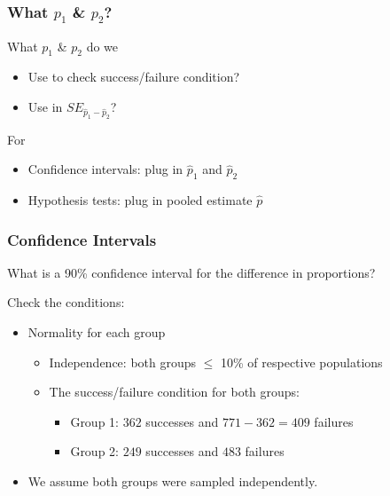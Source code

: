 \documentclass[handout]{beamer}
\newcommand{\blue}[1]{\textcolor{blue2}{#1}}
\newcommand{\phat}{\widehat{p}}
\begin{document}
\begin{frame}[fragile]
\frametitle{What $p_1$ \& $p_2$?}

%
%
What $p_1$ \& $p_2$ do we
\begin{itemize}
\item Use to check success/failure condition?
\item Use in $SE_{\phat_1 - \phat_2}$?
\end{itemize}

For
\begin{itemize}
\item Confidence intervals:  plug in $\phat_1$ and $\phat_2$
\item Hypothesis tests:  plug in \blue{pooled estimate} $\phat$
\end{itemize}

\end{frame}


\begin{frame}[fragile]
\frametitle{Confidence Intervals}
What is a 90\% confidence interval for the difference in proportions?

\vspace{0.25cm}

%
%
\pause Check the conditions:
\begin{itemize}
\item Normality for each group
\begin{itemize}
\pause\item Independence:  both groups $\leq$ 10\% of respective populations
\pause\item The success/failure condition for \blue{both} groups:
\begin{itemize}
\item Group 1:  $362$ successes and $771-362=409$ failures
\item Group 2:  $249$ successes and $483$ failures
\end{itemize}
\end{itemize}
\pause\item We assume both groups were sampled independently.  
\end{itemize}

\end{frame}
\end{document}

